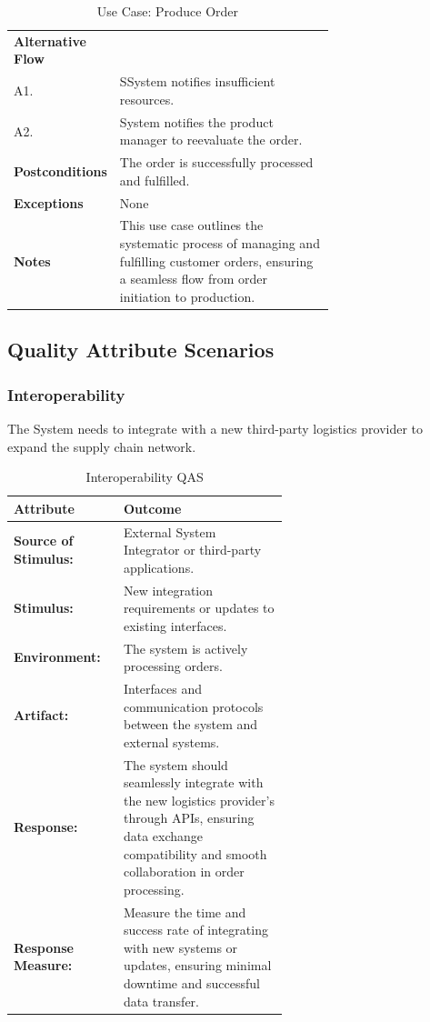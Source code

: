 \documentclass[conference]{IEEEtran}
\begin{document}
\begin{table}[H]
\begin{tabular}{|l|p{0.7\linewidth}|}
        \hline
        \textbf{Alternative Flow} & \\
        A1. & SSystem notifies insufficient resources. \\
        A2. & System notifies the product manager to reevaluate the order. \\
        \hline
        \textbf{Postconditions} & The order is successfully processed and fulfilled. \\
        \hline
        \textbf{Exceptions} & None \\
        \hline
        \textbf{Notes} & This use case outlines the systematic process of managing and fulfilling customer orders, ensuring a seamless flow from order initiation to production. \\
        \hline
    \end{tabular}
    \caption{Use Case: Produce Order}
\end{table}


\subsection{Quality Attribute Scenarios}
\label{sec:qas}


\subsubsection{\textbf{Interoperability}}The System needs to integrate with a new third-party logistics provider to expand the supply chain network.

\begin{table}[H]
    \centering
    \begin{tabular}{|l|p{0.6\linewidth}|}
        \hline
        \textbf{Attribute} & \textbf{Outcome} \\
        \hline
        \textbf{Source of Stimulus:} & External System Integrator or third-party applications. \\
        \hline
        \textbf{Stimulus:} & New integration requirements or updates to existing interfaces. \\
        \hline
        \textbf{Environment:} & The system is actively processing orders. \\
        \hline
        \textbf{Artifact:} & Interfaces and communication protocols between the system and external systems. \\
        \hline
        \textbf{Response:} & The system should seamlessly integrate with the new logistics provider's through APIs, ensuring data exchange compatibility and smooth collaboration in order processing. \\
        \hline
        \textbf{Response Measure:} & Measure the time and success rate of integrating with new systems or updates, ensuring minimal downtime and successful data transfer. \\
        \hline
    \end{tabular}
    \caption{Interoperability QAS}
\end{table}
\end{document}
